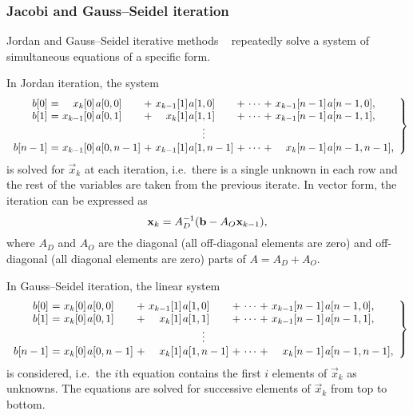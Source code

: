 \subsubsection{Jacobi and Gauss--Seidel iteration}
\label{ssec:algorithms:jgs}

Jordan and Gauss--Seidel iterative methods%
~\citep[Section~10.3.2--3]{stewart2009probability} repeatedly solve a
system of simultaneous equations of a specific form.

In Jordan iteration, the system
{\small\begin{equation} \left.
      \begin{array}{r@{${} = {}$}*{2}{r@{\kern1pt}l@{${} + {}$}}c@{${} + {}$}r@{\kern1pt}l}
        b[0] & x_{k}[0] & a[0,0] & x_{k - 1}[1] & a[1,0] & \cdots & x_{k - 1}[n - 1] & a[n - 1,0] \text,\\
        b[1] & x_{k - 1}[0] & a[0,1] & x_{k}[1] & a[1,1] & \cdots & x_{k - 1}[n - 1] & a[n - 1,1] \text,\\
        \multicolumn{8}{c}{$\vdots$} \\
        b[n - 1] & x_{k - 1}[0] & a[0,n - 1] & x_{k - 1}[1] & a[1,n - 1] & \cdots & x_{k}[n - 1] & a[n - 1,n - 1] \text,\\
      \end{array}
    \right\}
  \end{equation}}%
is solved for $\vec{x}_{k}$ at each iteration, i.e.~there is a
single unknown in each row and the rest of the variables are taken
from the previous iterate. In vector form, the iteration can be
expressed as
\begin{equation}
  \vec{x}_{k} = A_D^{-1} (\vec{b} - A_O \vec{x}_{k - 1}) \text,
\end{equation}
where $A_D$ and $A_O$ are the diagonal (all off-diagonal elements are
zero) and off-diagonal (all diagonal elements are zero) parts of $A =
A_D + A_O$.

In Gauss--Seidel iteration, the linear system
{\small\begin{equation}
    \left.
      \begin{array}{r@{${} = {}$}*{2}{r@{\kern1pt}l@{${} + {}$}}c@{${} + {}$}r@{\kern1pt}l}
        b[0] & x_{k}[0] & a[0,0] & x_{k - 1}[1] & a[1,0] & \cdots & x_{k - 1}[n - 1] & a[n - 1,0] \text,\\
        b[1] & x_{k}[0] & a[0,1] & x_{k}[1] & a[1,1] & \cdots & x_{k - 1}[n - 1] & a[n - 1,1] \text,\\
        \multicolumn{8}{c}{$\vdots$} \\
        b[n - 1] & x_{k}[0] & a[0,n - 1] & x_{k}[1] & a[1,n - 1] & \cdots & x_{k}[n - 1] & a[n - 1,n - 1] \text,\\
      \end{array}
    \right\}
  \end{equation}}%
is considered, i.e.~the $i$th equation contains the first $i$ elements
of $\vec{x}_k$ as unknowns. The equations are solved for successive
elements of $\vec{x}_k$ from top to bottom.

